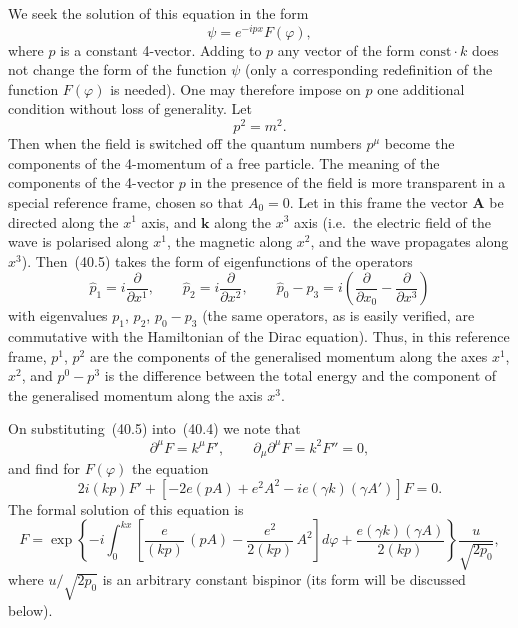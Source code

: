 We seek the solution of this equation in the form
\begin{equation}
\psi = e^{-ipx}F(\varphi),
\tag{40.5}
\end{equation}
where $p$ is a constant 4-vector. Adding to $p$ any vector of the form $\mathrm{const}\cdot k$ does not change the form of the function $\psi$ (only a corresponding redefinition of the function $F(\varphi)$ is needed). One may therefore impose on $p$ one additional condition without loss of generality. Let
\begin{equation}
p^2 = m^2.
\tag{40.6}
\end{equation}
Then when the field is switched off the quantum numbers $p^\mu$ become the components of the 4-momentum of a free particle. The meaning of the components of the 4-vector $p$ in the presence of the field is more transparent in a special reference frame, chosen so that $A_0 = 0$. Let in this frame the vector $\mathbf{A}$ be directed along the $x^1$ axis, and $\mathbf{k}$ along the $x^3$ axis (i.e.\ the electric field of the wave is polarised along $x^1$, the magnetic along $x^2$, and the wave propagates along $x^3$). Then~(40.5) takes the form of eigenfunctions of the operators
\[
\widehat p_1 = i\frac{\partial}{\partial x^1},\qquad \widehat p_2 = i\frac{\partial}{\partial x^2},\qquad \widehat p_0 - \widehat p_3 = i\!\left(\frac{\partial}{\partial x_0} - \frac{\partial}{\partial x^3}\right)
\]
with eigenvalues $p_1$, $p_2$, $p_0 - p_3$ (the same operators, as is easily verified, are commutative with the Hamiltonian of the Dirac equation). Thus, in this reference frame, $p^1$, $p^2$ are the components of the generalised momentum along the axes $x^1$, $x^2$, and $p^0 - p^3$ is the difference between the total energy and the component of the generalised momentum along the axis $x^3$.

On substituting~(40.5) into~(40.4) we note that
\[
\partial^\mu F = k^\mu F',\qquad \partial_\mu\partial^\mu F = k^2 F'' = 0,
\]
and find for $F(\varphi)$ the equation
\[
2i(kp)F' + [-2e(pA) + e^2A^2 - ie(\gamma k)(\gamma A')]F = 0.
\]
The formal solution of this equation is
\[
F = \exp\left\{-i\int_0^{kx}\!\left[\frac{e}{(kp)}\,(pA) - \frac{e^2}{2(kp)}\,A^2\right]\!d\varphi + \frac{e(\gamma k)(\gamma A)}{2(kp)}\right\}\frac{u}{\sqrt{2p_0}},
\]
where $u/\sqrt{2p_0}$ is an arbitrary constant bispinor (its form will be discussed below).

